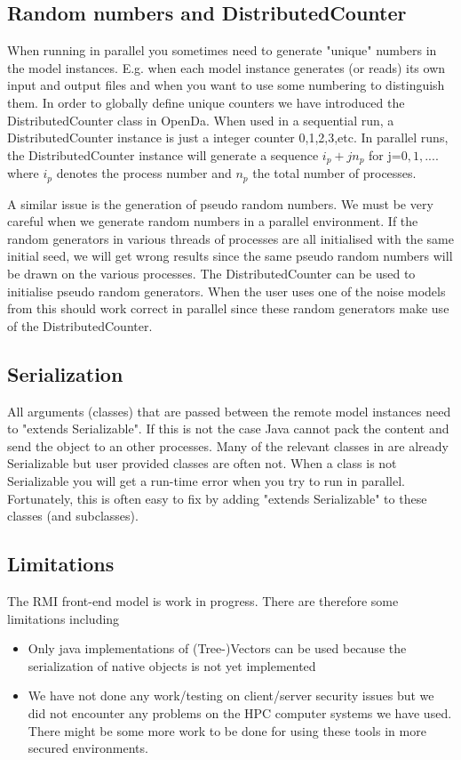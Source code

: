 \subsection{Random numbers and DistributedCounter}
When running in parallel you sometimes need to generate "unique" numbers in the
model instances. E.g. when each model instance generates (or reads) its own
input and output files and when you want to use some numbering to distinguish
them. In order to globally define unique counters we have introduced the
DistributedCounter class in OpenDa. When used in a sequential run, a
DistributedCounter instance is just a integer counter 0,1,2,3,etc. In parallel
runs, the DistributedCounter instance will generate a sequence $i_p+j n_p$ for
j=$0,1,....$ where $i_p$ denotes the process number and $n_p$ the total number
of processes.

A similar issue is the generation of pseudo random numbers. We must be very
careful when we generate random numbers in a parallel environment. If the
random generators in various threads of processes are all initialised with the
same initial seed, we will get wrong results since the same pseudo random
numbers will be drawn on the various processes. The DistributedCounter can be
used to initialise pseudo random generators. When the user uses one of the
noise models from \oda this should work correct in parallel since these random
generators make use of the DistributedCounter.


\subsection{Serialization}
All arguments (classes) that are passed between the remote model instances need
to "extends Serializable". If this is not the case Java cannot pack the content
and send the object to an other processes. Many of the relevant classes in \oda
are already Serializable but user provided classes are often not. When a class
is not Serializable you will get a run-time error when you try to run in
parallel. Fortunately, this is often easy to fix by adding "extends
Serializable" to these classes (and subclasses).

\subsection{Limitations}
The RMI front-end model is work in progress. There are therefore some
limitations including
\begin{itemize}
\item Only java implementations of (Tree-)Vectors can be used because the
  serialization of native objects is not yet implemented
\item We have not done any work/testing on client/server security issues but we
  did not encounter any problems on the HPC computer systems we have used.
  There might be some more work to be done for using these tools in more
  secured environments.
\end{itemize}


